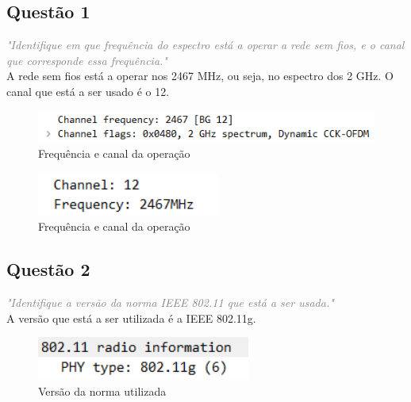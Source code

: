 \documentclass{llncs}
\newcommand{\questionE}[1]{\textcolor{gray}{\textit{"#1"}}}
\begin{document}
\subsection*{Questão 1}
\hspace{3mm} 
\questionE{Identifique em que frequência do espectro está a operar a rede sem fios, e o canal que corresponde essa frequência.}\\ 

A rede sem fios está a operar nos 2467 MHz, ou seja, no espectro dos 2 GHz. O canal que está a ser usado é o 12.

\begin{figure}[H]
\begin{center}
\includegraphics[width=12cm]{1.PNG}
\end{center}
\caption{Frequência e canal da operação}
\end{figure}

\begin{figure}[H]
\begin{center}
\includegraphics[width=6cm]{1a.PNG}
\end{center}
\caption{Frequência e canal da operação}
\end{figure}

\clearpage

\subsection*{Questão 2}
\hspace{3mm} 
\questionE{Identifique a versão da norma IEEE 802.11 que está a ser usada.}\\ 

A versão que está a ser utilizada é a IEEE 802.11g.

\begin{figure}[H]
\begin{center}
\includegraphics[width=7cm]{2.PNG}
\end{center}
\caption{Versão da norma utilizada}
\end{figure}
\end{document}
